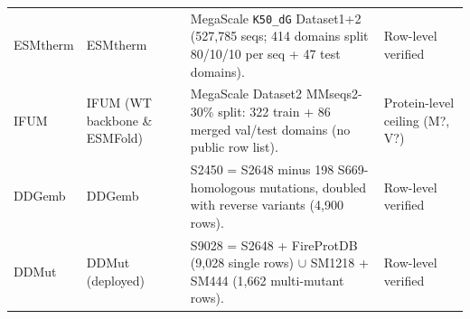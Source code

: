\begin{table}[H]
{\begin{tabular}{@{}p{2.3cm}p{3.6cm}p{7.8cm}p{3.3cm}}
        ESMtherm & ESMtherm & MegaScale \texttt{K50\_dG} Dataset1+2 (527,785 seqs; 414 domains split 80/10/10 per seq + 47 test domains). & Row-level verified \\
        IFUM & IFUM (WT backbone \& ESMFold) & MegaScale Dataset2 MMseqs2-30\% split: 322 train + 86 merged val/test domains (no public row list). & Protein-level ceiling (M?, V?) \\
        DDGemb & DDGemb & S2450 = S2648 minus 198 S669-homologous mutations, doubled with reverse variants (4,900 rows). & Row-level verified \\
        DDMut & DDMut (deployed) & S9028 = S2648 + FireProtDB (9,028 single rows) $\cup$ SM1218 + SM444 (1,662 multi-mutant rows). & Row-level verified \\
    \bottomrule
    \end{tabular}
    }
    \par\bigskip
\end{table}
